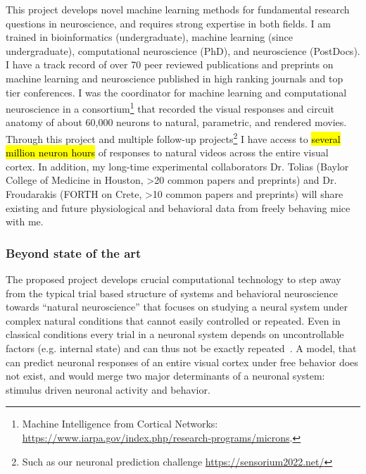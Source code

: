 \documentclass[COG,11pt]{ercgrant}
\begin{document}
This project develops novel machine learning methods for fundamental research questions in neuroscience, and requires strong expertise in both fields. 
I am trained in bioinformatics (undergraduate), machine learning (since undergraduate), computational neuroscience (PhD), and neuroscience (PostDocs). I have a track record of over 70 peer reviewed publications and preprints on machine learning and neuroscience published in high ranking journals and top tier conferences.
I was the coordinator for machine learning and computational neuroscience in a consortium\footnote{Machine Intelligence from Cortical Networks: \url{https://www.iarpa.gov/index.php/research-programs/microns}.} that recorded the visual responses and circuit anatomy of about 60,000 neurons to natural, parametric, and rendered movies. Through this project and multiple follow-up projects\footnote{Such as our neuronal prediction challenge \url{https://sensorium2022.net/}} I have access to \hl{several million neuron hours} of responses to natural videos across the entire visual cortex. In addition, my long-time experimental collaborators Dr. Tolias (Baylor College of Medicine in Houston, >20 common papers and preprints) and Dr. Froudarakis (FORTH on Crete, >10 common papers and preprints) will share existing and future physiological and behavioral data from freely behaving mice with me. 



\subsubsection{Beyond state of the art}
The proposed project develops crucial computational technology to step away from the typical trial based structure of systems and behavioral neuroscience towards ``natural neuroscience'' that focuses on studying a neural system under complex natural conditions that cannot easily controlled or repeated. Even in classical conditions every trial in a neuronal system depends on uncontrollable factors (e.g. internal state) and can thus not be exactly repeated~\parencite{Urai2022-fz}. 
A model, that can predict neuronal responses of an entire visual cortex under free behavior does not exist, and would merge two major determinants of a neuronal system: stimulus driven neuronal activity and behavior. 
\end{document}
